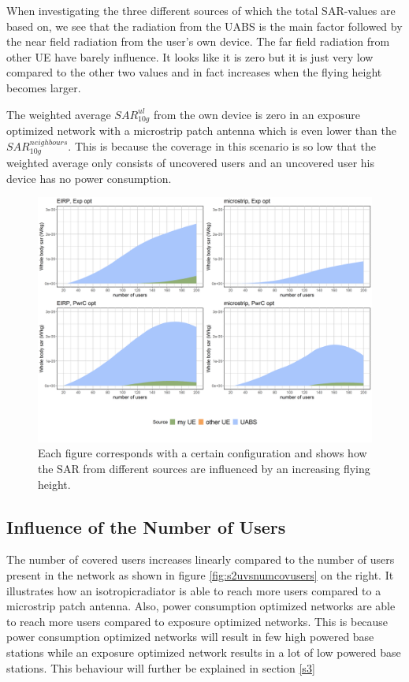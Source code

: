 When investigating the three different sources of which the total \gls{SAR}-values are based on, we see 
that the radiation from the \gls{UABS} is the main factor followed by the near field radiation from the user's own device.
The far field radiation from other \gls{UE} have barely influence. 
It looks like it is zero but it is just very low compared to the other two values and in fact increases when the flying height becomes larger.

The weighted average $SAR^{ul}_{10g}$ from the own device is zero in an exposure optimized network with a microstrip patch antenna which is even lower than the $SAR^{neighbours}_{10g}$.
This is because the coverage in this scenario is so low that the weighted average only consists of uncovered users and an uncovered user his device has no power consumption.

\begin{figure}[]
  \includegraphics[width=\textwidth]{../results/s2/fhFourSources.png}
  \caption{Each figure corresponds with a certain configuration and shows how the \gls{SAR} from different sources are influenced by an increasing flying height.}
  \label{fig:s2shfourSourcesMatrix}
\end{figure}

\FloatBarrier
\subsection{Influence of the Number of Users}
\label{s2b}

The number of covered users increases linearly compared to the number of users present in the network as shown in figure 
\ref{fig:s2uvsnumcovusers} on the right. It illustrates how an \gls{isotropicradiator} is able to reach more users 
compared to a microstrip patch antenna. Also, power consumption optimized networks are able to reach more users compared to exposure optimized networks.
This is because power consumption optimized networks will result in few high powered base stations while an 
exposure optimized network results in a lot of low powered base stations. This behaviour will further be explained in section \ref{s3}


